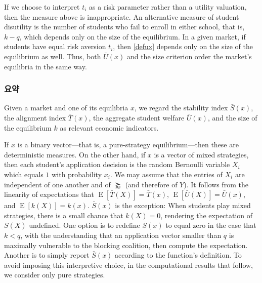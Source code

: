 \documentclass[12pt]{article} %
\newif\ifEN
\theoremstyle{definition}
\theoremstyle{definition}
\begin{document}
If we choose to interpret $t_i$ as a risk parameter rather than a utility valuation, then the measure above is inappropriate. An alternative measure of student disutility is the number of students who fail to enroll in either school, that is, $k - q$, which depends only on the size of the equilibrium. %
In a given market, if students have equal risk aversion $t_i$, then \eqref{defux} depends only on the size of the equilibrium as well. Thus, both $\bar U(x)$ and the size criterion order the market’s equilibria in the same way.

\ifEN \subsubsection{Summary} \else \subsubsection{요약} \fi \label{mixedstrategymeasures}
Given a market and one of its equilibria $x$, we regard the stability index $\bar S(x)$, the alignment index $\bar T(x)$, the aggregate student welfare $\bar U(x)$, and the size of the equilibrium $k$ as relevant economic indicators.

If $x$ is a binary vector---that is, a pure-strategy equilibrium---then these are deterministic measures. On the other hand, if $x$ is a vector of mixed strategies, then each student’s application decision is the random Bernoulli variable $X_i$ which equals $1$ with probability $x_i$. We may assume that the entries of $X_i$ are independent of one another and of $\succapprox$ (and therefore of $Y$). It follows from the linearity of expectations that $\operatorname{E}[\bar T(X)] = \bar T(x)$,  $\operatorname{E}[\bar U(X)] = \bar U(x)$, and $\operatorname{E}[k(X)] = k(x)$. $\bar S(x)$ is the exception: When students play mixed strategies, there is a small chance that $k(X) = 0$, rendering the expectation of $\bar S(X)$ undefined. One option is to redefine $\bar S(x)$ to equal zero in the case that $k < q$, with the understanding that an application vector smaller than $q$ is maximally vulnerable to the blocking coalition, then compute the expectation. Another is to simply report $\bar S(x)$ according to the function’s definition. To avoid imposing this interpretive choice, in the computational results that follow, we consider only pure strategies.
\end{document}
